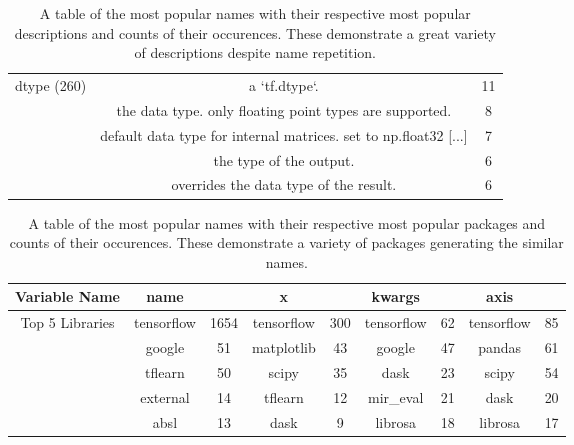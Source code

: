 \begin{table}[h]
\begin{center}
\begin{tabular}{c | c | c }
\\
\hline
dtype   (260) &  a `tf.dtype`.                                                       & 11 \\
& the data type. only floating point types are supported.             & 8 \\
& default data type for internal matrices. set to np.float32 [...]   & 7 \\
& the type of the output.                                             & 6 \\
& overrides the data type of the result.                              & 6 \\


    \end{tabular}
        \caption { A table of the most popular names with their respective most popular descriptions and counts of their occurences. These demonstrate a great variety of descriptions despite name repetition.}
    \label{table:descriptions_for_names} 
    \end{center}
\end{table}

\begin{table}[h]
    \begin{center}
    \begin{tabular}{c | c | c | c | c | c | c | c | c  }       

 Variable Name &name         & &  x            &  & kwargs   & &  axis    \\
\hline
Top 5 Libraries  &tensorflow         & 1654     & tensorflow    & 300       & tensorflow    & 62       & tensorflow    & 85 \\
&google             & 51       & matplotlib    & 43       & google        & 47       & pandas        & 61       \\
&tflearn            & 50       & scipy         & 35       & dask          & 23       & scipy         & 54       \\
&external           & 14       & tflearn       & 12       & mir\_eval     & 21       & dask          & 20       \\ 
&absl               & 13       & dask          & 9        & librosa       & 18       & librosa       & 17       \\



    \end{tabular}
        \caption { A table of the most popular names with their respective most popular packages and counts of their occurences. These demonstrate a variety of packages generating the similar names.}
    \label{table:packages_for_names} 
    \end{center}
\end{table}